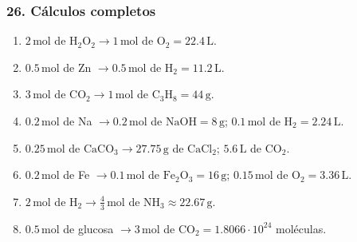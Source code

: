 \subsubsection*{26. Cálculos completos}
\begin{enumerate}
    \item[a)] $2\,\mathrm{mol}$ de $\mathrm{H_2O_2}\rightarrow
    1\,\mathrm{mol}$ de $\mathrm{O_2}=22.4\,\mathrm{L}$.

    \item[b)] $0.5\,\mathrm{mol}$ de Zn $\rightarrow
    0.5\,\mathrm{mol}$ de $\mathrm{H_2}=11.2\,\mathrm{L}$.

    \item[c)] $3\,\mathrm{mol}$ de $\mathrm{CO_2}\rightarrow
    1\,\mathrm{mol}$ de $\mathrm{C_3H_8}=44\,\mathrm{g}$.

    \item[d)] $0.2\,\mathrm{mol}$ de Na $\rightarrow
    0.2\,\mathrm{mol}$ de $\mathrm{NaOH}=8\,\mathrm{g}$;
    $0.1\,\mathrm{mol}$ de $\mathrm{H_2}=2.24\,\mathrm{L}$.

    \item[e)] $0.25\,\mathrm{mol}$ de $\mathrm{CaCO_3}\rightarrow
    27.75\,\mathrm{g}$ de $\mathrm{CaCl_2}$;
    $5.6\,\mathrm{L}$ de $\mathrm{CO_2}$.

    \item[f)] $0.2\,\mathrm{mol}$ de Fe $\rightarrow
    0.1\,\mathrm{mol}$ de $\mathrm{Fe_2O_3}=16\,\mathrm{g}$;
    $0.15\,\mathrm{mol}$ de $\mathrm{O_2}=3.36\,\mathrm{L}$.

    \item[g)] $2\,\mathrm{mol}$ de $\mathrm{H_2}\rightarrow
    \frac{4}{3}\,\mathrm{mol}$ de $\mathrm{NH_3}\approx22.67\,\mathrm{g}$.

    \item[h)] $0.5\,\mathrm{mol}$ de glucosa $\rightarrow
    3\,\mathrm{mol}$ de $\mathrm{CO_2}=1.8066\cdot10^{24}$ moléculas.
\end{enumerate}

